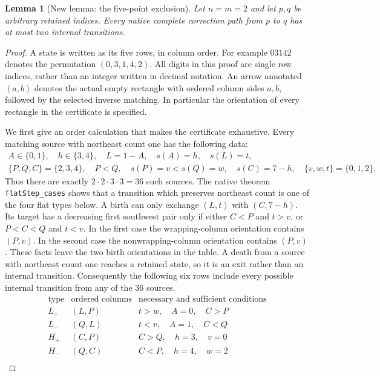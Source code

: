 \documentclass[11pt,oneside]{report}
\newtheorem{lemma}[theorem]{Lemma}
\theoremstyle{definition}
\numberwithin{equation}{section}
\newcommand{\decl}[1]{\textnormal{\nolinkurl{#1}}}
\begin{document}
\begin{lemma}[New lemma: the five-point exclusion]
\label{J05:lem:seam-size-five-truncation}
Let $n=m=2$ and let $p,q$ be arbitrary retained indices.
Every native complete correction path from $p$ to $q$ has at most two
internal transitions.
\end{lemma}
\begin{proof}
A state is written as its five rows, in column order. For example
$03142$ denotes the permutation $(0,3,1,4,2)$.
All digits in this proof are single row indices, rather than an integer
written in decimal notation. An arrow annotated $(a,b)$ denotes the
actual empty rectangle with ordered column sides $a,b$, followed by
the selected inverse matching. In particular the orientation of every
rectangle in the certificate is specified.

We first give an order calculation that makes the certificate exhaustive.
Every matching source with northeast count one has the following data:
\[
\begin{gathered}
 A\in\{0,1\},\quad h\in\{3,4\},\quad L=1-A,\quad s(A)=h,\quad s(L)=t,\\
 \{P,Q,C\}=\{2,3,4\},\quad P<Q,\quad
 s(P)=v<s(Q)=w,\quad s(C)=7-h,\quad
 \{v,w,t\}=\{0,1,2\}.
\end{gathered}
\]
Thus there are exactly $2\cdot2\cdot3\cdot3=36$ such sources.
The native theorem \decl{flatStep_cases} shows that a transition which
preserves northeast count is one of the four flat types below.
A birth can only exchange $(L,t)$ with $(C,7-h)$.
Its target has a decreasing first southwest pair only if either
$C<P$ and $t>v$, or $P<C<Q$ and $t<v$.
In the first case the wrapping-column orientation contains $(P,v)$.
In the second case the nonwrapping-column orientation contains $(P,v)$.
These facts leave the two birth orientations in the table.
A death from a source with northeast count one reaches a retained state,
so it is an exit rather than an internal transition.
Consequently the following six rows include every possible internal
transition from any of the 36 sources.
\[
\begin{array}{c|c|l}
 \text{type}&\text{ordered columns}&\text{necessary and sufficient conditions}\\\hline
 L_+&(L,P)&t>w,\quad A=0,\quad C>P\\
 L_-&(Q,L)&t<v,\quad A=1,\quad C<Q\\
 H_+&(C,P)&C>Q,\quad h=3,\quad v=0\\
 H_-&(Q,C)&C<P,\quad h=4,\quad w=2\\

\end{array}\]
\end{proof}
\end{document}
